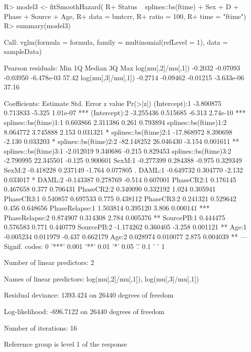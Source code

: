 \documentclass[article]{jss}
\begin{document}
\begin{CodeChunk}

\begin{CodeInput}
R> model3 <- fitSmoothHazard(
R+     Status ~ splines::bs(ftime) + Sex + D + Phase + Source + Age, 
R+     data = bmtcrr, 
R+     ratio = 100, 
R+     time = "ftime")
R> summary(model3)
\end{CodeInput}

\begin{CodeOutput}

Call:
vglm(formula = formula, family = multinomial(refLevel = 1), data = sampleData)


Pearson residuals:
                       Min       1Q   Median         3Q   Max
log(mu[,2]/mu[,1]) -0.2032 -0.07093 -0.03950 -6.478e-03 57.42
log(mu[,3]/mu[,1]) -0.2714 -0.09462 -0.01215 -3.633e-06 37.16

Coefficients: 
                        Estimate Std. Error z value Pr(>|z|)    
(Intercept):1          -3.800875   0.713833  -5.325 1.01e-07 ***
(Intercept):2          -3.255436   0.515685  -6.313 2.74e-10 ***
splines::bs(ftime)1:1   0.603866   2.311386   0.261 0.793894    
splines::bs(ftime)1:2   8.064772   3.745888   2.153 0.031321 *  
splines::bs(ftime)2:1 -17.868972   8.390698  -2.130 0.033203 *  
splines::bs(ftime)2:2 -82.148252  26.046430  -3.154 0.001611 ** 
splines::bs(ftime)3:1  -2.012019   9.340686  -0.215 0.829453    
splines::bs(ftime)3:2  -2.790995  22.345501  -0.125 0.900601    
SexM:1                 -0.277399   0.284388  -0.975 0.329349    
SexM:2                 -0.418228   0.237149  -1.764 0.077805 .  
DAML:1                 -0.649732   0.304770  -2.132 0.033017 *  
DAML:2                 -0.143387   0.278769  -0.514 0.607001    
PhaseCR2:1              0.176145   0.467658   0.377 0.706431    
PhaseCR2:2              0.340090   0.332192   1.024 0.305941    
PhaseCR3:1              0.540857   0.697533   0.775 0.438112    
PhaseCR3:2              0.241321   0.529642   0.456 0.648656    
PhaseRelapse:1          1.503814   0.395120   3.806 0.000141 ***
PhaseRelapse:2          0.874907   0.314308   2.784 0.005376 ** 
SourcePB:1              0.444475   0.576583   0.771 0.440779    
SourcePB:2             -1.174262   0.360405  -3.258 0.001121 ** 
Age:1                  -0.005234   0.011979  -0.437 0.662179    
Age:2                   0.028974   0.010077   2.875 0.004039 ** 
---
Signif. codes:  0 '***' 0.001 '**' 0.01 '*' 0.05 '.' 0.1 ' ' 1

Number of linear predictors:  2 

Names of linear predictors: log(mu[,2]/mu[,1]), log(mu[,3]/mu[,1])

Residual deviance: 1393.424 on 26440 degrees of freedom

Log-likelihood: -696.7122 on 26440 degrees of freedom

Number of iterations: 16 

Reference group is level  1  of the response
\end{CodeOutput}
\end{CodeChunk}
\end{document}
